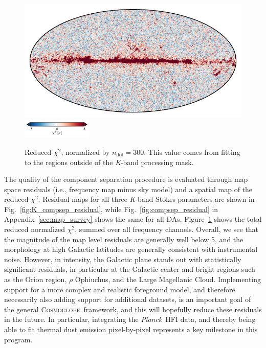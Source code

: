 \documentclass[twocolumn]{../../common/aa}
\def\Planck{\emph{Planck}}
\newcommand{\cosmoglobe}{\textsc{Cosmoglobe}}
\newcommand{\K}[0]{\textit K}
\begin{document}
\begin{figure}
	\centering
	\includegraphics[width=\linewidth]{figures/chisq_IQU.pdf}\\
	\includegraphics[width=0.3\textwidth]{figures/cbar_3sigma.pdf}
	\caption{Reduced-$\chi^2$, normalized by  $n_\mathrm{dof}=300$. This value comes from fitting to the regions outside of the \K-band processing mask.}\label{fig:reduced_chisq}
\end{figure}

The quality of the component separation procedure is evaluated through map space residuals (i.e., frequency map minus sky model) and a spatial map of the reduced $\chi^2$. Residual maps for all three \K-band Stokes parameters are shown in Fig.~\ref{fig:K_compsep_residual}, while Fig.~\ref{fig:compsep_residual} in Appendix~\ref{sec:map_survey} shows the same for all DAs. Figure~\ref{fig:reduced_chisq} shows the total reduced normalized $\chi^2$, summed over all frequency channels. Overall, we see that the magnitude of the map level residuals are generally well below 5\muK, and the morphology at high Galactic latitudes are generally consistent with instrumental noise. However, in intensity, the Galactic plane stands out with statistically significant residuals, in particular at the Galactic center and bright regions such as the Orion region, $\rho$ Ophiuchus, and the Large Magellanic Cloud. Implementing support for a more complex and realistic foreground model, and therefore necessarily also adding support for additional datasets, is an important goal of the general \cosmoglobe\ framework, and this will hopefully reduce these residuals in the future. In particular, integrating the \Planck\ HFI data, and thereby being able to fit thermal dust emission pixel-by-pixel represents a key milestone in this program. 
\end{document}
